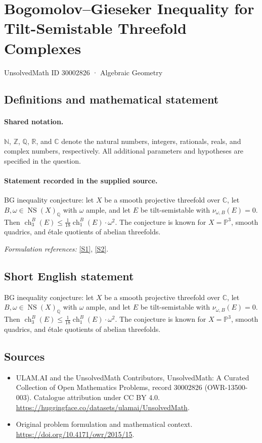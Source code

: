 \documentclass[11pt]{article}
\newcommand{\sref}[2]{\hyperlink{source:#1:#2}{[S#2]}}
\begin{document}
\setcounter{section}{30002825}
\section{Bogomolov–Gieseker Inequality for Tilt-Semistable Threefold Complexes}\label{30002826}
{\small UnsolvedMath ID 30002826 · Algebraic Geometry}
\subsection{Definitions and mathematical statement}

\paragraph{Shared notation.}$\mathbb N$, $\mathbb Z$, $\mathbb Q$, $\mathbb R$, and $\mathbb C$ denote the natural numbers, integers, rationals, reals, and complex numbers, respectively. All additional parameters and hypotheses are specified in the question.


\paragraph{Statement recorded in the supplied source.}
BG inequality conjecture: let $X$ be a smooth projective threefold over $\mathbb C$, let $B,\omega\in\operatorname{NS}(X)_{\mathbb Q}$ with $\omega$ ample, and let $E$ be tilt-semistable with $\nu_{\omega,B}(E)=0$. Then $\operatorname{ch}^{B}_{3}(E)\leq\frac{1}{18}\operatorname{ch}^{B}_{1}(E)\cdot\omega^{2}$. The conjecture is known for $X=\mathbb P^{3}$, smooth quadrics, and étale quotients of abelian threefolds.
\par\smallskip\textit{Formulation references:} \sref{30002826}{1}, \sref{30002826}{2}.
\subsection{Short English statement}
BG inequality conjecture: let $X$ be a smooth projective threefold over $\mathbb C$, let $B,\omega\in\operatorname{NS}(X)_{\mathbb Q}$ with $\omega$ ample, and let $E$ be tilt-semistable with $\nu_{\omega,B}(E)=0$. Then $\operatorname{ch}^{B}_{3}(E)\leq\frac{1}{18}\operatorname{ch}^{B}_{1}(E)\cdot\omega^{2}$. The conjecture is known for $X=\mathbb P^{3}$, smooth quadrics, and étale quotients of abelian threefolds.
\subsection{Sources}
\begin{itemize}
\item[\hypertarget{source:30002826:1}{S1}] ULAM.AI and the UnsolvedMath Contributors, UnsolvedMath: A Curated Collection of Open Mathematics Problems, record 30002826 (OWR-13500-003). Catalogue attribution under CC BY 4.0.
\url{https://huggingface.co/datasets/ulamai/UnsolvedMath}.
\item[\hypertarget{source:30002826:2}{S2}] Original problem formulation and mathematical context.
\url{https://doi.org/10.4171/owr/2015/15}.
\end{itemize}
\label{end:30002826}
\end{document}
